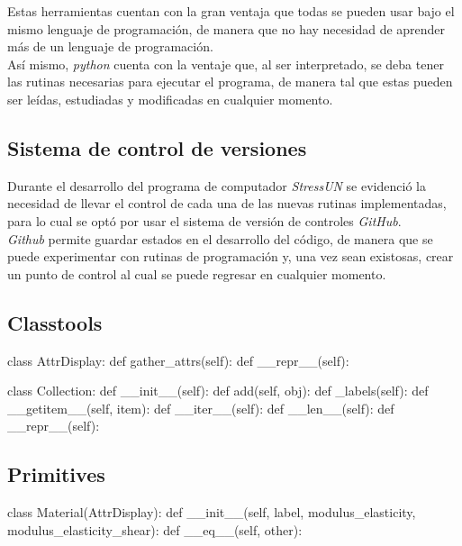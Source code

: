 Estas herramientas cuentan con la gran ventaja que todas se pueden usar bajo el mismo lenguaje de programación, de manera que no hay necesidad de aprender más de un lenguaje de programación. \\

Así mismo, \textit{python} cuenta con la ventaje que, al ser interpretado, se deba tener las rutinas necesarias para ejecutar el programa, de manera tal que estas pueden ser leídas, estudiadas y modificadas en cualquier momento. \\

\subsection{Sistema de control de versiones}

Durante el desarrollo del programa de computador \textit{StressUN} se evidenció la necesidad de llevar el control de cada una de las nuevas rutinas implementadas, para lo cual se optó por usar el sistema de versión de controles \textit{GitHub}. \\

\textit{Github} permite guardar estados en el desarrollo del código, de manera que se puede experimentar con rutinas de programación y, una vez sean existosas, crear un punto de control al cual se puede regresar en cualquier momento.

\subsection{Classtools}

\begin{codigoprog}
class AttrDisplay:
    def gather_attrs(self):
    def __repr__(self):
\end{codigoprog}

\begin{codigoprog}
class Collection:
    def __init__(self):
    def add(self, obj):
    def _labels(self):
    def __getitem__(self, item):
    def __iter__(self):
    def __len__(self):
    def __repr__(self):
\end{codigoprog}

\subsection{Primitives}

\begin{codigoprog}
class Material(AttrDisplay):
    def __init__(self, label, modulus_elasticity, modulus_elasticity_shear):
    def __eq__(self, other):
\end{codigoprog}

